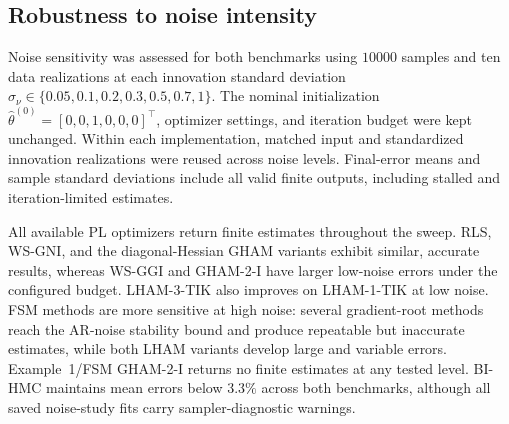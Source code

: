 \subsection{Robustness to noise intensity}
\label{subsec:experimental_noise_sensitivity}
Noise sensitivity was assessed for both benchmarks using $10000$ samples and ten data realizations at each innovation standard deviation $\sigma_\nu\in\{0.05,0.1,0.2,0.3,0.5,0.7,1\}$. The nominal initialization $\hat\theta^{(0)}=[0,0,1,0,0,0]^\top$, optimizer settings, and iteration budget were kept unchanged. Within each implementation, matched input and standardized innovation realizations were reused across noise levels. Final-error means and sample standard deviations include all valid finite outputs, including stalled and iteration-limited estimates.

All available PL optimizers return finite estimates throughout the sweep. RLS, WS-GNI, and the diagonal-Hessian GHAM variants exhibit similar, accurate results, whereas WS-GGI and GHAM-2-I have larger low-noise errors under the configured budget. LHAM-3-TIK also improves on LHAM-1-TIK at low noise. FSM methods are more sensitive at high noise: several gradient-root methods reach the AR-noise stability bound and produce repeatable but inaccurate estimates, while both LHAM variants develop large and variable errors. Example~1/FSM GHAM-2-I returns no finite estimates at any tested level. BI-HMC maintains mean errors below $3.3\%$ across both benchmarks, although all saved noise-study fits carry sampler-diagnostic warnings.
